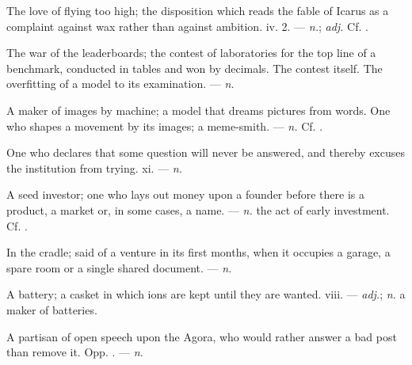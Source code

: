  The love of flying too high; the disposition which reads the fable of Icarus as a complaint against wax rather than against ambition.   iv. 2. ---  \textit{n.};  \textit{adj.} Cf. .

 The war of the leaderboards; the contest of laboratories for the top line of a benchmark, conducted in tables and won by decimals.  The contest itself.   The overfitting of a model to its examination.   ---  \textit{n.}

  A maker of images by machine; a model that dreams pictures from words.   One who shapes a movement by its images; a meme-smith. ---  \textit{n.} Cf. .

 One who declares that some question will never be answered, and thereby excuses the institution from trying.   xi. ---  \textit{n.}

 A seed investor; one who lays out money upon a founder before there is a product, a market or, in some cases, a name. ---  \textit{n.} the act of early investment. Cf. .

 In the cradle; said of a venture in its first months, when it occupies a garage, a spare room or a single shared document.   ---  \textit{n.}

 A battery; a casket in which ions are kept until they are wanted.   viii. ---  \textit{adj.};  \textit{n.} a maker of batteries.

 A partisan of open speech upon the Agora, who would rather answer a bad post than remove it. Opp. . ---  \textit{n.}

